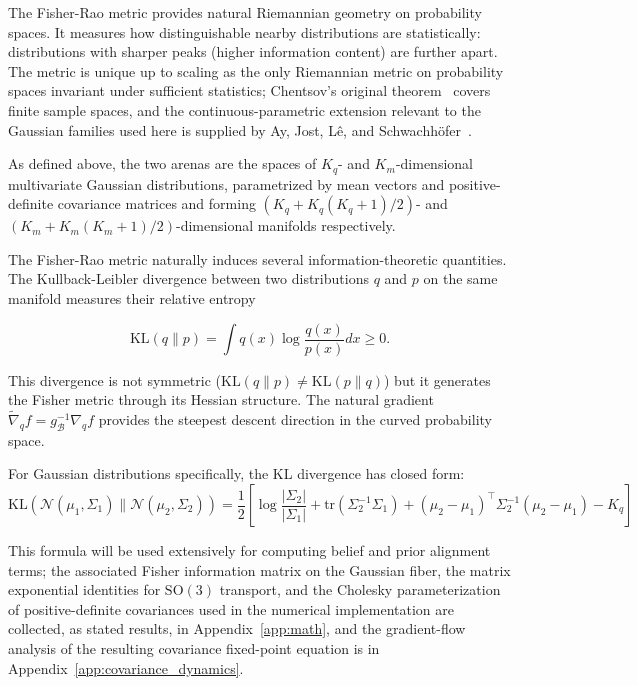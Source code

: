 \documentclass[11pt]{article}
\begin{document}
The Fisher-Rao metric provides natural Riemannian geometry on probability spaces. It measures how distinguishable nearby distributions are statistically: distributions with sharper peaks (higher information content) are further apart. The metric is unique up to scaling as the only Riemannian metric on probability spaces invariant under sufficient statistics; Chentsov's original theorem~\cite{Cencov1982} covers finite sample spaces, and the continuous-parametric extension relevant to the Gaussian families used here is supplied by Ay, Jost, L\^{e}, and Schwachh\"{o}fer~\cite{AyJostLeSchwachhofer2017}.

As defined above, the two arenas are the spaces of $K_q$- and $K_m$-dimensional multivariate Gaussian distributions, parametrized by mean vectors and positive-definite covariance matrices and forming $(K_q + K_q(K_q+1)/2)$- and $(K_m + K_m(K_m+1)/2)$-dimensional manifolds respectively.

The Fisher-Rao metric naturally induces several information-theoretic quantities. The Kullback-Leibler divergence between two distributions $q$ and $p$ on the same manifold measures their relative entropy

\begin{equation}
\mathrm{KL}(q \| p) = \int q(x) \log\frac{q(x)}{p(x)} dx \geq 0.
\end{equation}

This divergence is not symmetric ($\mathrm{KL}(q \| p) \neq \mathrm{KL}(p \| q)$) but it generates the Fisher metric through its Hessian structure. The natural gradient $\tilde{\nabla}_q f = g^{-1}_{\mathcal{B}} \nabla_q f$ provides the steepest descent direction in the curved probability space.

For Gaussian distributions specifically, the KL divergence has closed form:
\begin{equation}
\mathrm{KL}(\mathcal{N}(\mu_1, \Sigma_1) \| \mathcal{N}(\mu_2, \Sigma_2)) = \frac{1}{2}\left[\log\frac{|\Sigma_2|}{|\Sigma_1|} + \mathrm{tr}(\Sigma_2^{-1}\Sigma_1) + (\mu_2 - \mu_1)^\top\Sigma_2^{-1}(\mu_2 - \mu_1) - K_q\right]
\label{eq:gaussian_kl}
\end{equation}

This formula will be used extensively for computing belief and prior alignment terms; the associated Fisher information matrix on the Gaussian fiber, the matrix exponential identities for $\mathrm{SO}(3)$ transport, and the Cholesky parameterization of positive-definite covariances used in the numerical implementation are collected, as stated results, in Appendix~\ref{app:math}, and the gradient-flow analysis of the resulting covariance fixed-point equation is in Appendix~\ref{app:covariance_dynamics}.
\end{document}
